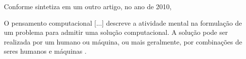 Conforme sintetiza em um outro artigo, no ano de 2010,






\begin{citacao}
  O pensamento computacional $[$...$]$ descreve a atividade mental na formulação de um problema para admitir 
uma solução computacional. A solução pode ser realizada por um humano ou máquina, 
ou mais geralmente, por combinações de seres humanos e máquinas \cite[tradução nossa]{Wing2010}.
\end{citacao}










